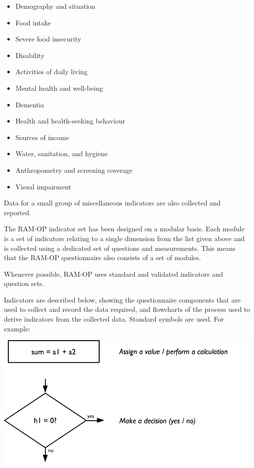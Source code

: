 \documentclass[12pt,a4paper]{book}
\providecommand{\tightlist}{%
  \setlength{\itemsep}{0pt}\setlength{\parskip}{0pt}}
\theoremstyle{definition}
\theoremstyle{definition}
\theoremstyle{definition}
\theoremstyle{remark}
\begin{document}
\begin{itemize}
\tightlist
\item
  Demography and situation
\item
  Food intake
\item
  Severe food insecurity
\item
  Disability
\item
  Activities of daily living
\item
  Mental health and well-being
\item
  Dementia
\item
  Health and health-seeking behaviour
\item
  Sources of income
\item
  Water, sanitation, and hygiene
\item
  Anthropometry and screening coverage
\item
  Visual impairment
\end{itemize}

Data for a small group of miscellaneous indicators are also collected
and reported.

The RAM-OP indicator set has been designed on a modular basis. Each
module is a set of indicators relating to a single dimension from the
list given above and is collected using a dedicated set of questions and
measurements. This means that the RAM-OP questionnaire also consists of
a set of modules.

Whenever possible, RAM-OP uses standard and validated indicators and
question sets.

Indicators are described below, showing the questionnaire components
that are used to collect and record the data required, and flowcharts of
the process used to derive indicators from the collected data. Standard
symbols are used. For example:

\begin{center}\includegraphics[width=800pt]{figures/indicators01} \end{center}
\end{document}

